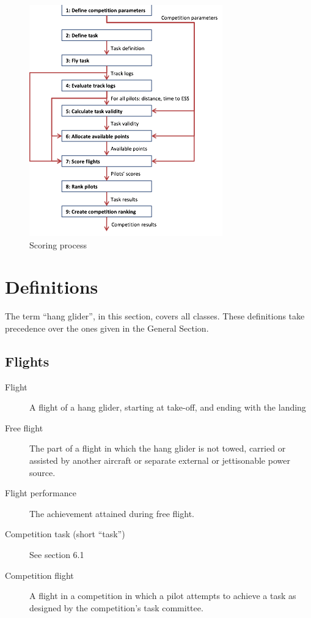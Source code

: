 \documentclass{article}
\begin{document}
\begin{figure}
    \includegraphics[scale=0.8]{img/scoring-process.png}
    \caption{Scoring process}
\end{figure}

\newpage
\section{Definitions}
The term “hang glider”, in this section, covers all classes. These definitions
take precedence over the ones given in the General Section.

\subsection{Flights}
\begin{description}
    \item [Flight]
        A flight of a hang glider, starting at take-off, and ending with the
        landing
    \item [Free flight]
        The part of a flight in which the hang glider is not towed, carried or
        assisted by another aircraft or separate external or jettisonable power
        source.
    \item [Flight performance]
        The achievement attained during free flight.
    \item [Competition task (short “task”)]
        See section 6.1
    \item [Competition flight]
        A flight in a competition in which a pilot attempts to achieve a task
        as designed by the competition’s task committee.
\end{description}
\end{document}
